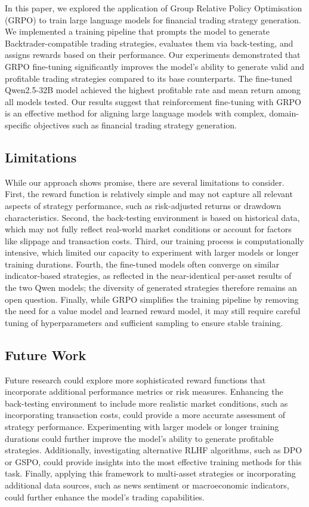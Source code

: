 \documentclass[conference]{IEEEtran}
\begin{document}
In this paper, we explored the application of Group Relative Policy Optimisation (GRPO) to train large language models for financial trading strategy generation.
We implemented a training pipeline that prompts the model to generate Backtrader-compatible trading strategies, evaluates them via back-testing, and assigns rewards based on their performance.
Our experiments demonstrated that GRPO fine-tuning significantly improves the model's ability to generate valid and profitable trading strategies compared to its base counterparts.
The fine-tuned Qwen2.5-32B model achieved the highest profitable rate and mean return among all models tested.
Our results suggest that reinforcement fine-tuning with GRPO is an effective method for aligning large language models with complex, domain-specific objectives such as financial trading strategy generation.

\subsection{Limitations}

While our approach shows promise, there are several limitations to consider.
First, the reward function is relatively simple and may not capture all relevant aspects of strategy performance, such as risk-adjusted returns or drawdown characteristics.
Second, the back-testing environment is based on historical data, which may not fully reflect real-world market conditions or account for factors like slippage and transaction costs.
Third, our training process is computationally intensive, which limited our capacity to experiment with larger models or longer training durations.
Fourth, the fine-tuned models often converge on similar indicator-based strategies, as reflected in the near-identical per-asset results of the two Qwen models; the diversity of generated strategies therefore remains an open question.
Finally, while GRPO simplifies the training pipeline by removing the need for a value model and learned reward model, it may still require careful tuning of hyperparameters and sufficient sampling to ensure stable training.

\subsection{Future Work}

Future research could explore more sophisticated reward functions that incorporate additional performance metrics or risk measures.
Enhancing the back-testing environment to include more realistic market conditions, such as incorporating transaction costs, could provide a more accurate assessment of strategy performance.
Experimenting with larger models or longer training durations could further improve the model's ability to generate profitable strategies.
Additionally, investigating alternative RLHF algorithms, such as DPO or GSPO, could provide insights into the most effective training methods for this task.
Finally, applying this framework to multi-asset strategies or incorporating additional data sources, such as news sentiment or macroeconomic indicators, could further enhance the model's trading capabilities.



\end{document}
